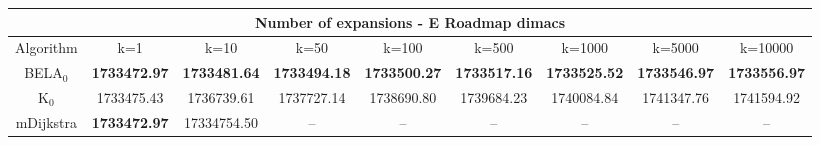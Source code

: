 \begin{tabular}{c|cccccccc}\toprule
\multicolumn{9}{c}{Number of expansions - E Roadmap dimacs}\\ \midrule
Algorithm & k=1 & k=10 & k=50 & k=100 & k=500 & k=1000 & k=5000 & k=10000 \\ \midrule
BELA$_0$ & \textbf{1733472.97} & \textbf{1733481.64} & \textbf{1733494.18} & \textbf{1733500.27} & \textbf{1733517.16} & \textbf{1733525.52} & \textbf{1733546.97} & \textbf{1733556.97} \\
K$_0$ & 1733475.43 & 1736739.61 & 1737727.14 & 1738690.80 & 1739684.23 & 1740084.84 & 1741347.76 & 1741594.92 \\
mDijkstra & \textbf{1733472.97} & 17334754.50 & -- & -- & -- & -- & -- & -- \\ \bottomrule 
\end{tabular}
